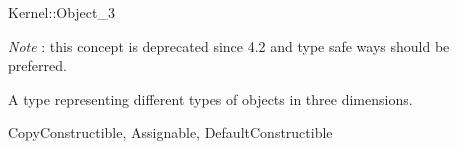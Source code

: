 \begin{ccRefConcept}{Kernel::Object_3}
\begin{ccDeprecated}
{\em Note} : this concept is deprecated since 4.2 and type safe ways should be preferred. 

A type representing different types of objects in three dimensions.

\ccRefines
CopyConstructible, Assignable, DefaultConstructible 

\ccSeeAlso
{} \\
 \\
 \\
 \\

\end{ccDeprecated}
\end{ccRefConcept}
